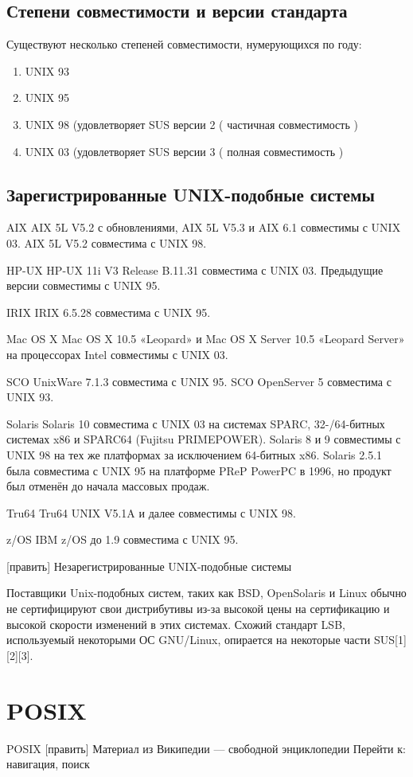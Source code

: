 \subsection {Степени совместимости и версии стандарта}
Существуют несколько степеней совместимости, нумерующихся по году:
\begin{enumerate}
\item UNIX 93
\item UNIX 95
\item UNIX 98 (удовлетворяет SUS версии 2 ( частичная совместимость )
\item UNIX 03 (удовлетворяет SUS версии 3 ( полная совместимость )
\end{enumerate}
\subsection{Зарегистрированные UNIX-подобные системы}

AIX
    AIX 5L V5.2 с обновлениями, AIX 5L V5.3 и AIX 6.1 совместимы с UNIX 03. AIX 5L V5.2 совместима с UNIX 98.

HP-UX
    HP-UX 11i V3 Release B.11.31 совместима с UNIX 03. Предыдущие версии совместимы с UNIX 95.

IRIX
    IRIX 6.5.28 совместима с UNIX 95.

Mac OS X
    Mac OS X 10.5 «Leopard» и Mac OS X Server 10.5 «Leopard Server» на процессорах Intel совместимы с UNIX 03.

SCO
    UnixWare 7.1.3 совместима с UNIX 95. SCO OpenServer 5 совместима с UNIX 93.

Solaris
    Solaris 10 совместима с UNIX 03 на системах SPARC, 32-/64-битных системах x86 и SPARC64 (Fujitsu PRIMEPOWER). Solaris 8 и 9 совместимы с UNIX 98 на тех же платформах за исключением 64-битных x86. Solaris 2.5.1 была совместима с UNIX 95 на платформе PReP PowerPC в 1996, но продукт был отменён до начала массовых продаж.

Tru64
    Tru64 UNIX V5.1A и далее совместимы с UNIX 98.

z/OS
    IBM z/OS до 1.9 совместима с UNIX 95.

[править] Незарегистрированные UNIX-подобные системы

Поставщики Unix-подобных систем, таких как BSD, OpenSolaris и Linux обычно не сертифицируют свои дистрибутивы из-за высокой цены на сертификацию и высокой скорости изменений в этих системах. Схожий стандарт LSB, используемый некоторыми ОС GNU/Linux, опирается на некоторые части SUS[1][2][3].
\section{POSIX}
POSIX
[править]
Материал из Википедии — свободной энциклопедии
Перейти к: навигация, поиск

